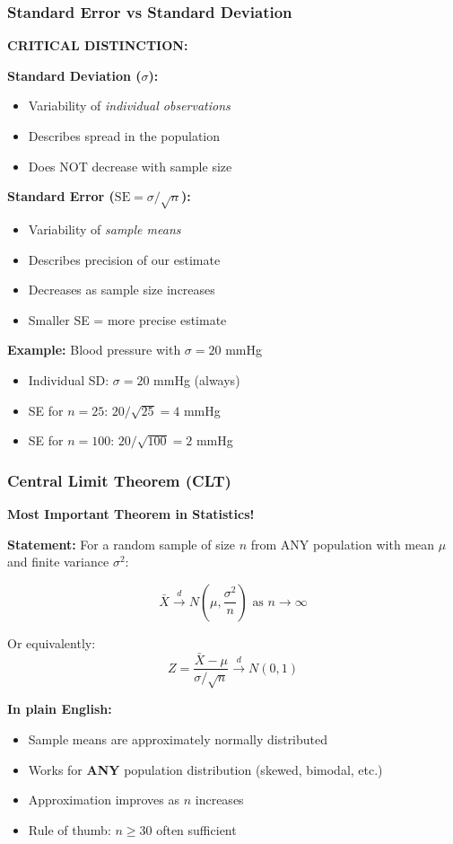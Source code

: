 \documentclass{beamer}
\begin{document}
\begin{frame}
\frametitle{Standard Error vs Standard Deviation}
\textbf{CRITICAL DISTINCTION:}

\vspace{0.3cm}
\textbf{Standard Deviation ($\sigma$):}
\begin{itemize}
\item Variability of \textit{individual observations}
\item Describes spread in the population
\item Does NOT decrease with sample size
\end{itemize}

\vspace{0.3cm}
\textbf{Standard Error ($\text{SE} = \sigma/\sqrt{n}$):}
\begin{itemize}
\item Variability of \textit{sample means}
\item Describes precision of our estimate
\item Decreases as sample size increases
\item Smaller SE = more precise estimate
\end{itemize}

\vspace{0.3cm}
\textbf{Example:} Blood pressure with $\sigma = 20$ mmHg
\begin{itemize}
\item Individual SD: $\sigma = 20$ mmHg (always)
\item SE for $n=25$: $20/\sqrt{25} = 4$ mmHg
\item SE for $n=100$: $20/\sqrt{100} = 2$ mmHg
\end{itemize}
\end{frame}

\begin{frame}
\frametitle{Central Limit Theorem (CLT)}
\textbf{Most Important Theorem in Statistics!}

\vspace{0.5cm}
\textbf{Statement:}
For a random sample of size $n$ from ANY population with mean $\mu$ and finite variance $\sigma^2$:

$$\bar{X} \xrightarrow{d} N\left(\mu, \frac{\sigma^2}{n}\right) \text{ as } n \to \infty$$

Or equivalently:
$$Z = \frac{\bar{X} - \mu}{\sigma/\sqrt{n}} \xrightarrow{d} N(0, 1)$$

\vspace{0.5cm}
\textbf{In plain English:}
\begin{itemize}
\item Sample means are approximately normally distributed
\item Works for \textbf{ANY} population distribution (skewed, bimodal, etc.)
\item Approximation improves as $n$ increases
\item Rule of thumb: $n \geq 30$ often sufficient
\end{itemize}
\end{frame}
\end{document}
